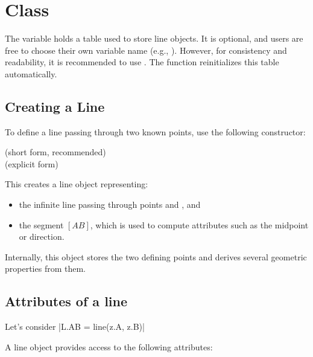 \newpage
\section{Class } %

The variable  holds a table used to store line objects. It is optional, and users are free to choose their own variable name (e.g., ).
However, for consistency and readability, it is recommended to use . The function  reinitializes this table automatically.


\subsection{Creating a Line}
\label{sub:creating_a_line}

To define a line passing through two known points, use the following constructor:

\begin{mybox}
   \hfill (short form, recommended)\\
   \hfill (explicit form)
\end{mybox}

This creates a line object  representing:
\begin{itemize}
  \item the infinite line passing through points  and , and
  \item the segment $[AB]$, which is used to compute attributes such as the midpoint or direction.
\end{itemize}

\medskip
\noindent
Internally, this object stores the two defining points and derives several geometric properties from them.

\subsection{Attributes of a line} %

Let's consider  |L.AB = line(z.A, z.B)|

A line object provides access to the following attributes:

